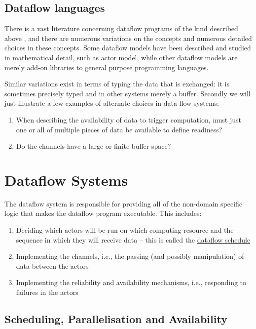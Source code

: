 \documentclass[11pt,a4paper]{article}
\begin{document}
\subsection{Dataflow languages}

There is a vast literature concerning dataflow programs of the kind
described above \citep[see the review
by][]{Johnston:2004:ADP:1013208.1013209}, and there are numerous
variations on the concepts and numerous detailed choices in these
concepts.  Some dataflow models have been described and studied in
mathematical detail, such as \cite{Hewitt:1973:UMA:1624775.1624804}
actor model, while other dataflow models are merely add-on libraries
to general purpose programming languages.

Similar variations exist in terms of typing the data that is
exchanged: it is sometimes precisely typed and in other systems merely
a buffer. Secondly we will just illustrate a few examples of alternate
choices in data flow systems:
\begin{enumerate}
  \item When describing the availability of data
  to trigger computation, must just one or all of multiple pieces of
  data be available to define readiness?  
\item Do the channels have a large or finite buffer space?
\end{enumerate}


\section{Dataflow Systems}
\label{sec:dataflow-systems}

The dataflow system is responsible for providing all of the non-domain
specific logic that makes the dataflow program executable. This
includes:
\begin{enumerate}
\item Deciding which actors will be run on which computing resource
  and the sequence in which they will receive data -- this is called
  the \underline{dataflow schedule}
\item Implementing the channels, i.e., the passing (and possibly
  manipulation) of data between the actors
\item Implementing the reliability and availability mechanisms, i.e.,
  responding to failures in the actors 
\end{enumerate}

\subsection{Scheduling, Parallelisation and Availability}
\end{document}
